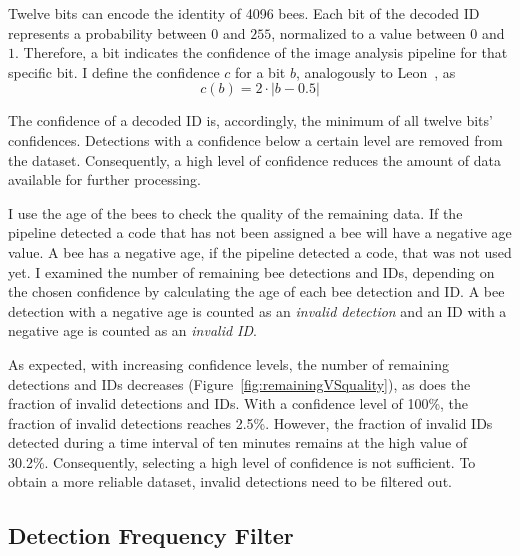 \footnotetext{}

Twelve bits can encode the identity of 4096 bees.
Each bit of the decoded ID represents a probability between $0$ and $255$, normalized to a value between $0$ and $1$.
Therefore, a bit indicates the confidence of the image analysis pipeline for that specific bit.
I define the confidence $c$ for a bit $b$, analogously to Leon~\textcite[p.~14]{leon2016}, as
\begin{equation}
\label{eq:confidence}
c(b)=2\cdot|b-0.5|
\end{equation}

The confidence of a decoded ID is, accordingly, the minimum of all twelve bits' confidences.
Detections with a confidence below a certain level are removed from the dataset.
Consequently, a high level of confidence reduces the amount of data available for further processing.

I use the age of the bees to check the quality of the remaining data.
If the pipeline detected a code that has not been assigned a bee will have a negative age value.
A bee has a negative age, if the pipeline detected a code, that was not used yet.
I examined the number of remaining bee detections and IDs, depending on the chosen confidence by calculating the age of each bee detection and ID.
A bee detection with a negative age is counted as an \emph{invalid detection} and an ID with a negative age is counted as an \emph{invalid ID}.

As expected, with increasing confidence levels, the number of remaining detections and IDs decreases (Figure~\ref{fig:remainingVSquality}), as does the fraction of invalid detections and IDs.
With a confidence level of 100\%, the fraction of invalid detections reaches 2.5\%.
However, the fraction of invalid IDs detected during a time interval of ten minutes remains at the high value of 30.2\%. Consequently, selecting a high level of confidence is not sufficient.
To obtain a more reliable dataset, invalid detections need to be filtered out.


\subsection{Detection Frequency Filter}
\label{subsubsec:dataset:filter}

